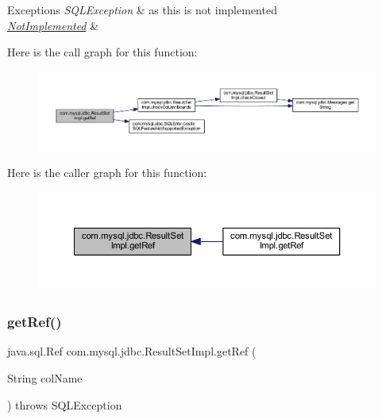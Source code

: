 \begin{DoxyExceptions}{Exceptions}
{\em S\+Q\+L\+Exception} & as this is not implemented \\
\hline
{\em \mbox{\hyperlink{classcom_1_1mysql_1_1jdbc_1_1_not_implemented}{Not\+Implemented}}} & \\
\hline
\end{DoxyExceptions}
Here is the call graph for this function\+:
\nopagebreak
\begin{figure}[H]
\begin{center}
\leavevmode
\includegraphics[width=350pt]{classcom_1_1mysql_1_1jdbc_1_1_result_set_impl_a1ac9c4862814fa6b5439c71a4f4cdac8_cgraph}
\end{center}
\end{figure}
Here is the caller graph for this function\+:
\nopagebreak
\begin{figure}[H]
\begin{center}
\leavevmode
\includegraphics[width=350pt]{classcom_1_1mysql_1_1jdbc_1_1_result_set_impl_a1ac9c4862814fa6b5439c71a4f4cdac8_icgraph}
\end{center}
\end{figure}
\mbox{\label{classcom_1_1mysql_1_1jdbc_1_1_result_set_impl_af8b105dab46bd80b9d201a544e993e68}} 
\subsubsection{\texorpdfstring{get\+Ref()}{getRef()}\hspace{0.1cm}{\footnotesize\ttfamily [2/2]}}
{\footnotesize\ttfamily java.\+sql.\+Ref com.\+mysql.\+jdbc.\+Result\+Set\+Impl.\+get\+Ref (\begin{DoxyParamCaption}\item[{String}]{col\+Name }\end{DoxyParamCaption}) throws S\+Q\+L\+Exception}

